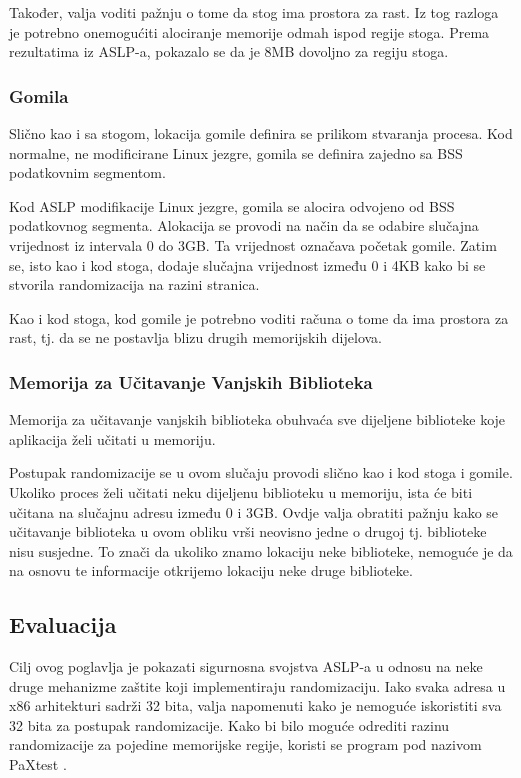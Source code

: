 \documentclass[times, utf8, diplomski, numeric]{fer}
\begin{document}
Također, valja voditi pažnju o tome da stog ima prostora za rast.
Iz tog razloga je potrebno onemogućiti alociranje memorije odmah
ispod regije stoga. Prema rezultatima iz ASLP-a, pokazalo se da
je 8MB dovoljno za regiju stoga.

\subsubsection{Gomila}

Slično kao i sa stogom, lokacija gomile definira se prilikom
stvaranja procesa. Kod normalne, ne modificirane Linux jezgre,
gomila se definira zajedno sa BSS podatkovnim segmentom. 

Kod ASLP modifikacije Linux jezgre, gomila se alocira odvojeno od
BSS podatkovnog segmenta. Alokacija se provodi na način da se
odabire slučajna vrijednost iz intervala 0 do 3GB. Ta vrijednost
označava početak gomile. Zatim se, isto kao i kod stoga, dodaje
slučajna vrijednost između 0 i 4KB kako bi se stvorila
randomizacija na razini stranica.

Kao i kod stoga, kod gomile je potrebno voditi računa o tome da
ima prostora za rast, tj. da se ne postavlja blizu drugih
memorijskih dijelova.

\subsubsection{Memorija za Učitavanje Vanjskih Biblioteka}

Memorija za učitavanje vanjskih biblioteka
obuhvaća sve dijeljene biblioteke koje aplikacija želi učitati u
memoriju. 

Postupak randomizacije se u ovom slučaju provodi slično kao i kod
stoga i gomile. Ukoliko proces želi učitati neku dijeljenu
biblioteku u memoriju, ista će biti učitana na slučajnu adresu
između 0 i 3GB. Ovdje valja obratiti pažnju kako se učitavanje
biblioteka u ovom obliku vrši neovisno jedne o drugoj tj.
biblioteke nisu susjedne. To znači da ukoliko znamo lokaciju neke
biblioteke, nemoguće je da na osnovu te informacije otkrijemo
lokaciju neke druge biblioteke.

\subsection{Evaluacija}

Cilj ovog poglavlja je pokazati sigurnosna svojstva ASLP-a u
odnosu na neke druge mehanizme zaštite koji implementiraju
randomizaciju. Iako svaka adresa u x86 arhitekturi sadrži 32
bita, valja napomenuti kako je nemoguće iskoristiti sva 32 bita
za postupak randomizacije. Kako bi bilo moguće odrediti razinu
randomizacije za pojedine memorijske regije, koristi se program
pod nazivom PaXtest \citep{pax_test}. 
\end{document}
